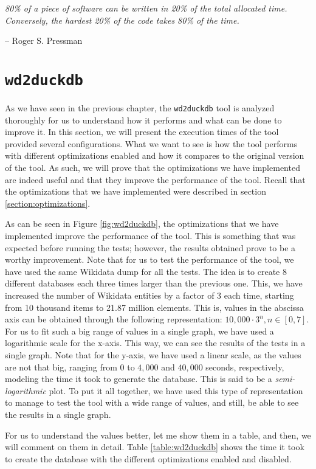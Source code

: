 \epigraph{\textit{80\% of a piece of software can be written in 20\% of the total allocated time. Conversely, the hardest 20\% of the code takes 80\% of the time.}}{-- \textup{Roger S. Pressman}}

\section{\texttt{wd2duckdb}}

As we have seen in the previous chapter, the \texttt{wd2duckdb} tool is analyzed thoroughly for us to understand how it performs and what can be done to improve it. In this section, we will present the execution times of the tool provided several configurations. What we want to see is how the tool performs with different optimizations enabled and how it compares to the original version of the tool. As such, we will prove that the optimizations we have implemented are indeed useful and that they improve the performance of the tool. Recall that the optimizations that we have implemented were described in section \ref{section:optimizations}.

As can be seen in Figure \ref{fig:wd2duckdb}, the optimizations that we have implemented improve the performance of the tool. This is something that was expected before running the tests; however, the results obtained prove to be a worthy improvement. Note that for us to test the performance of the tool, we have used the same Wikidata dump for all the tests. The idea is to create 8 different databases each three times larger than the previous one. This, we have increased the number of Wikidata entities by a factor of 3 each time, starting from 10 thousand items to 21.87 million elements. This is, values in the abscissa axis
can be obtained through the following representation: $10,000 \cdot 3^n, n \in [0, 7]$. For us to fit such a big range of values in a single graph, we have used a logarithmic scale for the x-axis. This way, we can see the results of the tests in a single graph. Note that for the y-axis, we have used a linear scale, as the values are not that big, ranging from $0$ to $4,000$ and $40,000$ seconds, respectively, modeling the time it took to generate the database. This is said to be a \textit{semi-logarithmic} plot. To put it all together, we have used this type of representation to manage to test the tool with a wide range of values, and still, be able to see the results in a single graph.

For us to understand the values better, let me show them in a table, and then, we will comment on them in detail. Table \ref{table:wd2duckdb} shows the time it took to create the database with the different optimizations enabled and disabled.


